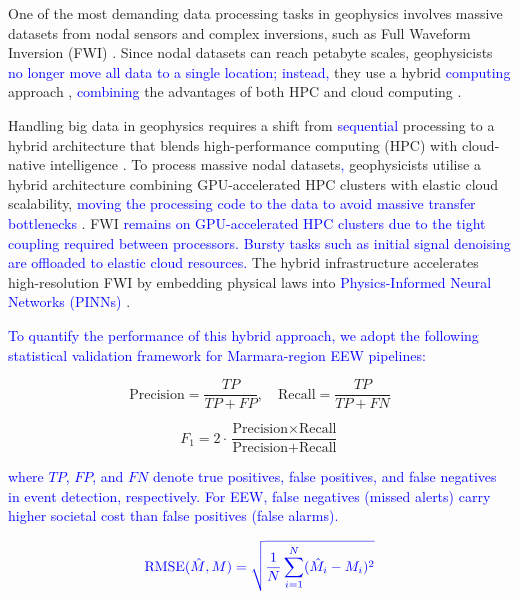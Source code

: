 \documentclass[data,article,submit,pdftex,moreauthors]{Definitions/mdpi}
\begin{document}
One of the most demanding data processing tasks in geophysics involves massive datasets from nodal sensors and complex inversions, such as Full Waveform Inversion (FWI) \cite{witte2019scalable}. Since nodal datasets can reach petabyte scales, geophysicists \textcolor{blue}{no longer move all data to a single location; instead,} they use a hybrid \textcolor{blue}{computing} approach \cite{peter2011forward,wang2020cloud}, \textcolor{blue}{combining} the advantages of both HPC and cloud computing \cite{fox2017big,assuncao2015big}.

Handling big data in geophysics requires a shift from \textcolor{blue}{sequential} processing to a hybrid architecture that blends high-performance computing (HPC) with cloud-native intelligence \cite{fox2017big,hashem2015rise}. To process massive nodal datasets\textcolor{blue}{,} geophysicists utilise a hybrid architecture combining GPU-accelerated HPC clusters with elastic cloud scalability, \textcolor{blue}{moving the processing code to the data to avoid massive transfer bottlenecks} \cite{wang2020cloud}. FWI \textcolor{blue}{remains on GPU-accelerated HPC clusters due to the tight coupling required between processors. Bursty tasks such as initial signal denoising are offloaded to elastic cloud resources.} The hybrid infrastructure accelerates high-resolution FWI by embedding physical laws into \textcolor{blue}{Physics-Informed Neural Networks (PINNs)} \cite{raissi2019physics,sun2020surrogate}.

\textcolor{blue}{To quantify the performance of this hybrid approach, we adopt the following statistical validation framework for Marmara-region EEW pipelines:}

\begin{equation}
\text{Precision} = \frac{TP}{TP + FP}, \quad \text{Recall} = \frac{TP}{TP + FN}
\end{equation}

\begin{equation}
F_1 = 2 \cdot \frac{\text{Precision} \times \text{Recall}}{\text{Precision} + \text{Recall}}
\end{equation}

\textcolor{blue}{where $TP$, $FP$, and $FN$ denote true positives, false positives, and false negatives in event detection, respectively. For EEW, false negatives (missed alerts) carry higher societal cost than false positives (false alarms).}

\begin{equation}
\textcolor{blue}{\text{RMSE}(\hat{M}, M) = \sqrt{\frac{1}{N}\sum_{i=1}^{N}(\hat{M}_i - M_i)^2}}
\end{equation}
\end{document}
